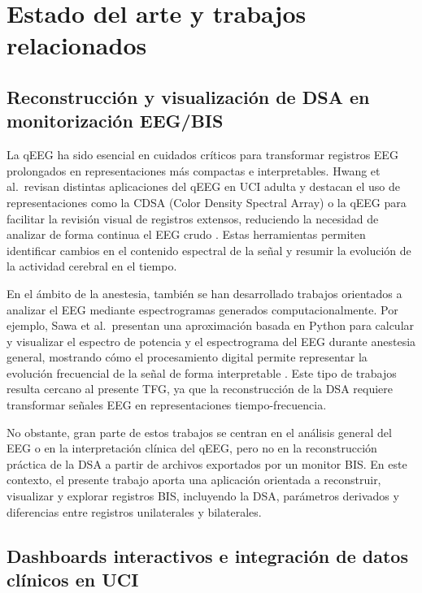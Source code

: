 \documentclass[
  spanish,
  a4paper,
  12pt,
  twoside]{memoir}
\begin{document}
\section{Estado del arte y trabajos
relacionados}\label{estado-del-arte-y-trabajos-relacionados}

\subsection{Reconstrucción y visualización de DSA en monitorización
EEG/BIS}\label{reconstrucciuxf3n-y-visualizaciuxf3n-de-dsa-en-monitorizaciuxf3n-eegbis}

La qEEG ha sido esencial en cuidados críticos para transformar registros
EEG prolongados en representaciones más compactas e interpretables.
Hwang et al.~revisan distintas aplicaciones del qEEG en UCI adulta y
destacan el uso de representaciones como la CDSA (Color Density Spectral
Array) o la qEEG para facilitar la revisión visual de registros
extensos, reduciendo la necesidad de analizar de forma continua el EEG
crudo \citep{Hwang2022}. Estas herramientas permiten identificar cambios
en el contenido espectral de la señal y resumir la evolución de la
actividad cerebral en el tiempo.

En el ámbito de la anestesia, también se han desarrollado trabajos
orientados a analizar el EEG mediante espectrogramas generados
computacionalmente. Por ejemplo, Sawa et al.~presentan una aproximación
basada en Python para calcular y visualizar el espectro de potencia y el
espectrograma del EEG durante anestesia general, mostrando cómo el
procesamiento digital permite representar la evolución frecuencial de la
señal de forma interpretable \citep{Sawa2022}. Este tipo de trabajos
resulta cercano al presente TFG, ya que la reconstrucción de la DSA
requiere transformar señales EEG en representaciones tiempo-frecuencia.

No obstante, gran parte de estos trabajos se centran en el análisis
general del EEG o en la interpretación clínica del qEEG, pero no en la
reconstrucción práctica de la DSA a partir de archivos exportados por un
monitor BIS. En este contexto, el presente trabajo aporta una aplicación
orientada a reconstruir, visualizar y explorar registros BIS, incluyendo
la DSA, parámetros derivados y diferencias entre registros unilaterales
y bilaterales.

\subsection{Dashboards interactivos e integración de datos clínicos en
UCI}\label{dashboards-interactivos-e-integraciuxf3n-de-datos-cluxednicos-en-uci}
\end{document}

